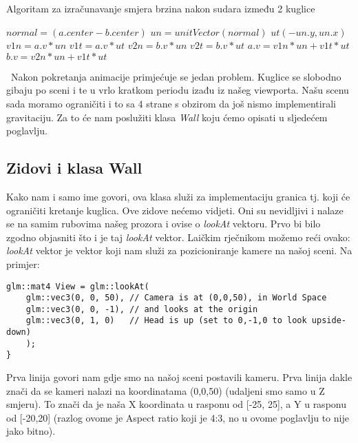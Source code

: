 \newpage
\begin{algorithm}
	\caption{Algoritam za izračunavanje smjera brzina nakon sudara između 2 kuglice}
	\label{alg:resolve_collision_1}
	\begin{algorithmic}
			\Return
			\EndIf
			\State $normal = (a.center - b.center)$
			\State $un = unitVector(normal)$
			\State $ut(-un.y,un.x)$
			\State $v1n = a.v * un$
			\State $v1t = a.v * ut$
			\State $v2n = b.v * un$
			\State $v2t = b.v * ut$
			\State $a.v = v1n * un + v1t * ut$
			\State $b.v = v2n * un + v1t * ut$
		\EndFunction
	\end{algorithmic}
\end{algorithm}\
Nakon pokretanja animacije primjećuje se jedan problem. Kuglice se slobodno gibaju po sceni i te u vrlo kratkom periodu izađu iz našeg viewporta. Našu scenu sada moramo ograničiti i to sa 4 strane s obzirom da još nismo implementirali gravitaciju. Za to će nam poslužiti klasa \emph{Wall} koju ćemo opisati u sljedećem poglavlju.

\subsection{Zidovi i klasa Wall}
Kako nam i samo ime govori, ova klasa služi za implementaciju granica tj. koji će ograničiti kretanje kuglica. Ove zidove nećemo vidjeti. Oni su nevidljivi i nalaze se na samim rubovima našeg prozora i ovise o \emph{lookAt} vektoru. Prvo bi bilo zgodno objasniti što i je taj \emph{lookAt} vektor. Laičkim rječnikom  možemo reći ovako: \emph{lookAt} vektor je vektor koji nam služi za pozicioniranje kamere na našoj sceni. Na primjer:\newpage
\begin{lstlisting}[style=myC++, label = {code:10}, caption={Primjer lookAt vektora iz glm knjižnice}]
glm::mat4 View = glm::lookAt(
	glm::vec3(0, 0, 50), // Camera is at (0,0,50), in World Space
	glm::vec3(0, 0, -1), // and looks at the origin
	glm::vec3(0, 1, 0)   // Head is up (set to 0,-1,0 to look upside-down)
	);
}
\end{lstlisting}
Prva linija govori nam gdje smo na našoj sceni postavili kameru. Prva linija dakle znači da se kameri nalazi na koordinatama (0,0,50) (udaljeni smo samo u Z smjeru). To znači da je naša X koordinata u rasponu od [-25, 25], a Y u rasponu od [-20,20] (razlog ovome je Aspect ratio koji je 4:3, no u ovome poglavlju to nije jako bitno).

